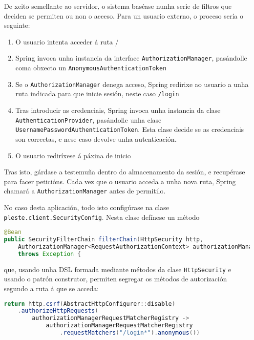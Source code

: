 De xeito semellante ao servidor, o sistema baséase nunha serie de filtros\cite{springsecarch} que deciden se permiten ou non o acceso. Para un usuario externo, o proceso sería o seguinte:

\begin{enumerate}
    \item O usuario intenta acceder á ruta /
    \item Spring invoca unha instancia da interface \texttt{Authorization\allowbreak{}Manager}, pasándolle coma obxecto un \texttt{Anonymous\allowbreak{}Authentication\allowbreak{}Token}
    \item Se o \texttt{Authorization\allowbreak{}Manager} denega acceso, Spring redirixe ao usuario a unha ruta indicada para que inicie sesión, neste caso \texttt{/login}
    \item Tras introducir as credenciais, Spring invoca unha instancia da clase \texttt{Authentication\allowbreak{}Provider}, pasándolle unha clase \texttt{Username\allowbreak{}Password\allowbreak{}Authentication\allowbreak{}Token}. Esta clase decide se as credenciais son correctas, e nese caso devolve unha autenticación.
    \item O usuario rediríxese á páxina de inicio
\end{enumerate}

Tras isto, gárdase a testemuña dentro do almacenamento da sesión, e recupérase para facer peticións. Cada vez que o usuario acceda a unha nova ruta, Spring chamará a \texttt{Authorization\allowbreak{}Manager} antes de permitilo.

No caso desta aplicación, todo isto configúrase na clase \texttt{pleste.\allowbreak{}client.\allowbreak{}Security\allowbreak{}Config}. Nesta clase defínese un método

\begin{lstlisting}[language=Java]
@Bean
public SecurityFilterChain filterChain(HttpSecurity http,
    AuthorizationManager<RequestAuthorizationContext> authorizationManager)
    throws Exception {
\end{lstlisting}

que, usando unha DSL formada mediante métodos da clase \texttt{HttpSecurity} e usando o patrón construtor, permiten segregar os métodos de autorización segundo a ruta á que se acceda:

\begin{lstlisting}[language=Java]
return http.csrf(AbstractHttpConfigurer::disable)
    .authorizeHttpRequests(
        authorizationManagerRequestMatcherRegistry ->
            authorizationManagerRequestMatcherRegistry
                .requestMatchers("/login*").anonymous())
\end{lstlisting}

